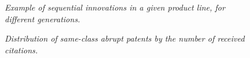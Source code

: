\documentclass[letterpaper,12pt]{article}
\theoremstyle{definition}
\begin{document}
\begin{figure}[htb]\centering \captionsetup{width=5.8in}
    \caption{\label{fig:QLadder}\textit{Example of sequential innovations in a given product line, for different generations.}}
\end{figure}

\begin{figure}[htb]\centering \captionsetup{width=5.8in}
    \caption{\label{fig:SameClassDistr}\textit{Distribution of same-class abrupt patents by the number of received citations.}}
\end{figure}
\end{document}
